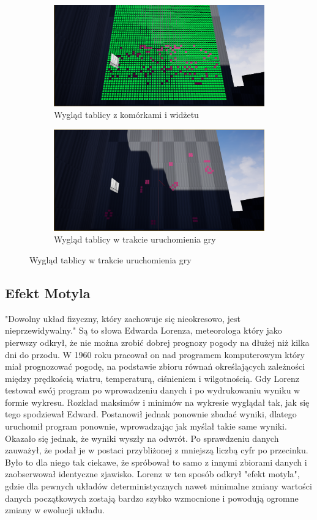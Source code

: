 \documentclass[a4paper,12pt,reqno]{article}
\begin{document}
\begin{figure}[H]%
	\centering
	\begin{subfigure}{.5\textwidth}
		\centering
		\includegraphics[width=0.8\linewidth]{graphics/gameoflife/GOLInUE_1.png}
		\caption{Wygląd tablicy z komórkami i widżetu}	
		\label{ref:subref_a}
	\end{subfigure}%
	\begin{subfigure}{.5\textwidth}
		\centering
		\includegraphics[width=0.8\linewidth]{graphics/gameoflife/GOLInUE_2.png}
		\caption{Wygląd tablicy w trakcie uruchomienia gry}
		\label{ref:subref_b}
	\end{subfigure}%
\label{ref:ref}
\end{figure}

\newpage
\subsection{Efekt Motyla}

"Dowolny układ fizyczny, który zachowuje się nieokresowo, jest nieprzewidywalny." Są to słowa Edwarda Lorenza, meteorologa który jako pierwszy odkrył, że nie można zrobić dobrej prognozy pogody na dłużej niż kilka dni do przodu. W 1960 roku pracował on nad programem komputerowym który miał prognozować pogodę, na podstawie zbioru równań określających zależności między prędkością wiatru, temperaturą, ciśnieniem i wilgotnością. Gdy Lorenz testował swój program po wprowadzeniu danych i po wydrukowaniu wyniku w formie wykresu. Rozkład maksimów i minimów na wykresie wyglądał tak, jak się tego spodziewał Edward. Postanowił jednak ponownie zbadać wyniki, dlatego uruchomił program ponownie, wprowadzając jak myślał takie same wyniki. Okazało się jednak, że wyniki wyszły na odwrót. Po sprawdzeniu danych zauważył, że podał je w postaci przybliżonej z mniejszą liczbą cyfr po przecinku. Było to dla niego tak ciekawe, że spróbował to samo z innymi zbiorami danych i zaobserwował identyczne zjawisko. Lorenz w ten sposób odkrył "efekt motyla", gdzie dla pewnych układów deterministycznych nawet minimalne zmiany wartości danych początkowych zostają bardzo szybko wzmocnione i powodują ogromne zmiany w ewolucji układu\cite{burze_motyle}.
\end{document}
